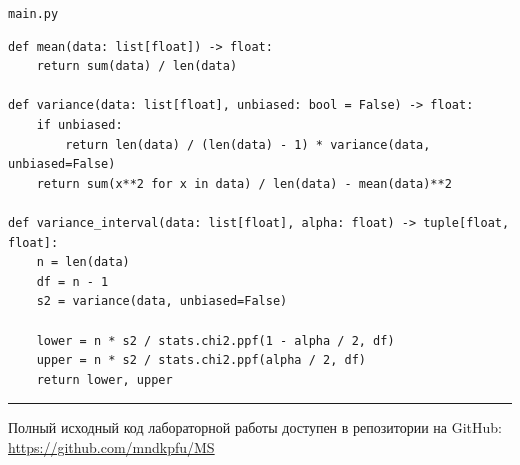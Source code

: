 \documentclass{article}
\begin{document}
\noindent \texttt{main.py}
\begin{Verbatim}[tabsize=4, fontsize=\small]
def mean(data: list[float]) -> float:
    return sum(data) / len(data)

def variance(data: list[float], unbiased: bool = False) -> float:
    if unbiased:
        return len(data) / (len(data) - 1) * variance(data, unbiased=False)
    return sum(x**2 for x in data) / len(data) - mean(data)**2

def variance_interval(data: list[float], alpha: float) -> tuple[float, float]:
    n = len(data)
    df = n - 1
    s2 = variance(data, unbiased=False)

    lower = n * s2 / stats.chi2.ppf(1 - alpha / 2, df)
    upper = n * s2 / stats.chi2.ppf(alpha / 2, df)
    return lower, upper
\end{Verbatim}


\vfill
\noindent\rule{\textwidth}{0.4pt}
\small Полный исходный код лабораторной работы доступен в репозитории на GitHub: \url{https://github.com/mndkpfu/MS}

\end{document}
